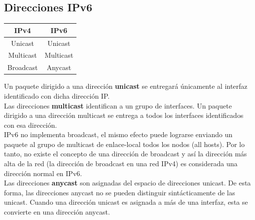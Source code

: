 \begin{onepage}
\subsection{Direcciones IPv6}

\begin{table}[H]\centering\begin{tabular}{|c|c|}\hline\rowcolor[HTML]{FFCC67}
IPv4 & IPv6 \\ \hline
Unicast & Unicast \\ \hline
Multicast & Multicast \\ \hline
Broadcast & Anycast \\ \hline
\end{tabular}\end{table}
Un paquete dirigido a una dirección \textbf{unicast} se entregará únicamente al interfaz identificado con dicha dirección IP.\\

Las direcciones \textbf{multicast} identifican a un grupo de interfaces. Un paquete dirigido a una dirección multicast se entrega a todos los interfaces
identificados con esa dirección.\\

IPv6 no implementa broadcast, el mismo efecto puede lograrse enviando un paquete al grupo de multicast de enlace-local todos los nodos (all hosts). Por lo tanto, no existe el concepto de una dirección de broadcast y así la dirección más alta de la red (la dirección de broadcast en una red IPv4) es considerada una dirección normal en IPv6.\\

Las direcciones \textbf{anycast} son asignadas del espacio de direcciones unicast. De esta forma, las direcciones anycast no se pueden distinguir sintácticamente de las unicast. Cuando una dirección unicast es asignada a más de una interfaz, esta se convierte en una dirección anycast.


\end{onepage}
